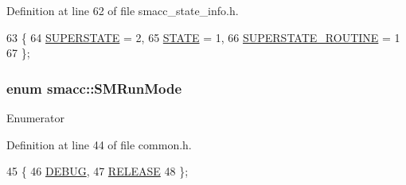 Definition at line 62 of file smacc\+\_\+state\+\_\+info.\+h.


\begin{DoxyCode}
63 \{
64     \hyperlink{namespacesmacc_a63f5f7aae7e563619d0886fca83612cca4da54a31b31f1c863864fdee05fc35c8}{SUPERSTATE} = 2,
65     \hyperlink{namespacesmacc_a63f5f7aae7e563619d0886fca83612cca2b848a8cc886d253d21a77c43cd50aae}{STATE} = 1,
66     \hyperlink{namespacesmacc_a63f5f7aae7e563619d0886fca83612cca6d39c20504d2f2afe9c8c27351e61d20}{SUPERSTATE\_ROUTINE} = 1
67 \};
\end{DoxyCode}
\subsubsection[{\texorpdfstring{S\+M\+Run\+Mode}{SMRunMode}}]{\setlength{\rightskip}{0pt plus 5cm}enum {\bf smacc\+::\+S\+M\+Run\+Mode}\hspace{0.3cm}{\ttfamily [strong]}}\hypertarget{namespacesmacc_a3e4f79486ea6ea6342dd3c712d16a4f6}{}\label{namespacesmacc_a3e4f79486ea6ea6342dd3c712d16a4f6}
\begin{Desc}
\item[Enumerator]\par
\begin{description}
\item[{\em 
D\+E\+B\+UG\hypertarget{namespacesmacc_a3e4f79486ea6ea6342dd3c712d16a4f6adc30ec20708ef7b0f641ef78b7880a15}{}\label{namespacesmacc_a3e4f79486ea6ea6342dd3c712d16a4f6adc30ec20708ef7b0f641ef78b7880a15}
}]\item[{\em 
R\+E\+L\+E\+A\+SE\hypertarget{namespacesmacc_a3e4f79486ea6ea6342dd3c712d16a4f6a7d649ef069df9885e382417c79f3d5cd}{}\label{namespacesmacc_a3e4f79486ea6ea6342dd3c712d16a4f6a7d649ef069df9885e382417c79f3d5cd}
}]\end{description}
\end{Desc}


Definition at line 44 of file common.\+h.


\begin{DoxyCode}
45 \{
46   \hyperlink{namespacesmacc_a3e4f79486ea6ea6342dd3c712d16a4f6adc30ec20708ef7b0f641ef78b7880a15}{DEBUG},
47   \hyperlink{namespacesmacc_a3e4f79486ea6ea6342dd3c712d16a4f6a7d649ef069df9885e382417c79f3d5cd}{RELEASE}
48 \};
\end{DoxyCode}



